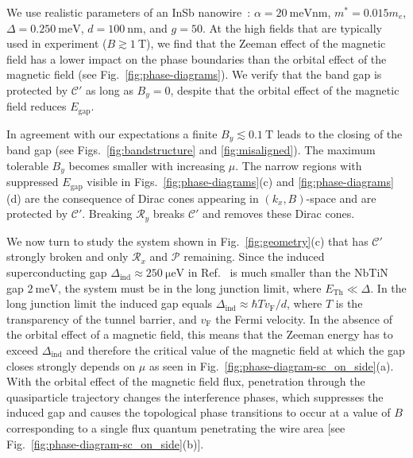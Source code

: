 We use realistic parameters of an InSb nanowire~\cite{Mourik2012}: $\alpha=\SI{20}{\milli\electronvolt \nano\metre}$, $m^{*}=0.015m_e$, $\Delta=\SI{0.250}{\milli\electronvolt}$, $d=\SI{100}{\nano\metre}$, and $g=50$.
At the high fields that are typically used in experiment ($B\apprge\SI{1}{\tesla}$), we find that the Zeeman effect of the magnetic field has a lower impact on the phase boundaries than the orbital effect of the magnetic field (see Fig.~\ref{fig:phase-diagrams}).
We verify that the band gap is protected by $\mathcal{C}'$ as long as $B_y = 0$, despite that the orbital effect of the magnetic field reduces $E_\textrm{gap}$.

In agreement with our expectations a finite $B_y \lesssim \SI{0.1}{\tesla}$ leads to the closing of the band gap (see Figs.~\ref{fig:bandstructure} and \ref{fig:misaligned}).
The maximum tolerable $B_y $ becomes smaller with increasing $\mu$.
The narrow regions with suppressed $E_\textrm{gap}$ visible in Figs.~\ref{fig:phase-diagrams}(c) and \ref{fig:phase-diagrams}(d) are the consequence of Dirac cones appearing in $(k_{x}, B)$-space and are protected by $\mathcal{C}'$.
Breaking $\mathcal{R}_y$ breaks $\mathcal{C}'$ and removes these Dirac cones.


We now turn to study the system shown in Fig.~\ref{fig:geometry}(c) that has $\mathcal{C}'$ strongly broken and only $\mathcal{R}_x$ and $\mathcal{P}$ remaining.
Since the induced superconducting gap $\Delta_\textrm{ind}\approx \SI{250}{\micro\electronvolt}$ in Ref.~\cite{Mourik2012} is much smaller than the $\mathrm{NbTiN}$ gap $\SI{2}{\milli\electronvolt}$, the system must be in the long junction limit, where $E_\textrm{Th} \ll \Delta$.
In the long junction limit the induced gap equals $\Delta_\textrm{ind}\approx\hbar T v_\textrm{F} / d$, where $T$ is the transparency of the tunnel barrier, and $v_\textrm{F}$ the Fermi velocity.
In the absence of the orbital effect of a magnetic field, this means that the Zeeman energy has to exceed $\Delta_\textrm{ind}$ and therefore the critical value of the magnetic field at which the gap closes strongly depends on $\mu$ as seen in Fig.~\ref{fig:phase-diagram-sc_on_side}(a).
With the orbital effect of the magnetic field flux, penetration through the quasiparticle trajectory changes the interference phases, which suppresses the induced gap and causes the topological phase transitions to occur at a value of $B$ corresponding to a single flux quantum penetrating the wire area [see Fig.~\ref{fig:phase-diagram-sc_on_side}(b)].


